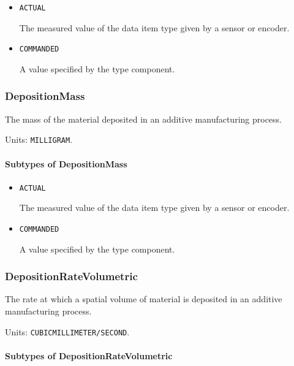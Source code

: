 \begin{itemize}

\item \texttt{ACTUAL}


The measured value of the data item type given by a sensor or encoder.

\item \texttt{COMMANDED}


A value specified by the  type component.


\end{itemize}

\subsubsection{DepositionMass}
\label{sec:DepositionMass}



The mass of the material deposited in an additive manufacturing process.


Units: \texttt{MILLIGRAM}.

\paragraph{Subtypes of DepositionMass}\mbox{}
\label{sec:Subtypes of DepositionMass}

\begin{itemize}

\item \texttt{ACTUAL}


The measured value of the data item type given by a sensor or encoder.

\item \texttt{COMMANDED}


A value specified by the  type component.


\end{itemize}

\subsubsection{DepositionRateVolumetric}
\label{sec:DepositionRateVolumetric}



The rate at which a spatial volume of material is deposited in an additive manufacturing process.


Units: \texttt{CUBIC\textunderscore MILLIMETER/SECOND}.

\paragraph{Subtypes of DepositionRateVolumetric}\mbox{}
\label{sec:Subtypes of DepositionRateVolumetric}


